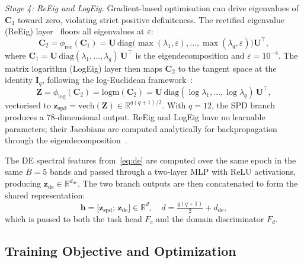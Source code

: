 \textit{Stage 4: ReEig and LogEig.}
Gradient-based optimisation can drive eigenvalues of $\mathbf{C}_1$ toward zero,
violating strict positive definiteness.
The rectified eigenvalue (ReEig) layer~\cite{huang2017riemannian} floors all
eigenvalues at $\varepsilon$:
\begin{equation}
  \mathbf{C}_2 = \phi_\mathrm{rec}(\mathbf{C}_1)
    = \mathbf{U}\,\mathrm{diag}\!\bigl(\max(\lambda_1,\varepsilon),\ldots,
      \max(\lambda_q,\varepsilon)\bigr)\mathbf{U}^\top,
  \label{eq:reeig}
\end{equation}
where $\mathbf{C}_1 = \mathbf{U}\,\mathrm{diag}(\lambda_1,\ldots,\lambda_q)\,\mathbf{U}^\top$
is the eigendecomposition and $\varepsilon = 10^{-4}$.
The matrix logarithm (LogEig) layer then maps $\mathbf{C}_2$ to the tangent
space at the identity $\mathbf{I}_q$, following the log-Euclidean
framework~\cite{arsigny2007geometric}:
\begin{equation}
  \mathbf{Z} = \phi_\mathrm{log}(\mathbf{C}_2)
    = \mathrm{logm}(\mathbf{C}_2)
    = \mathbf{U}\,\mathrm{diag}(\log\lambda_1,\ldots,\log\lambda_q)\,\mathbf{U}^\top,
  \label{eq:logeig}
\end{equation}
vectorised to $\mathbf{z}_\mathrm{spd} = \mathrm{vech}(\mathbf{Z})
\in\mathbb{R}^{q(q+1)/2}$.
With $q=12$, the SPD branch produces a 78-dimensional output.
ReEig and LogEig have no learnable parameters; their Jacobians are computed
analytically for backpropagation through the
eigendecomposition~\cite{huang2017riemannian}.

The DE spectral features from~\eqref{eq:de} are computed over the same epoch
in the same $B=5$ bands and passed through a two-layer MLP with ReLU activations,
producing $\mathbf{z}_\mathrm{de}\in\mathbb{R}^{d_\mathrm{de}}$.
The two branch outputs are then concatenated to form the shared representation:
\begin{equation}
  \mathbf{h} = \bigl[\mathbf{z}_\mathrm{spd};\,\mathbf{z}_\mathrm{de}\bigr]
    \in \mathbb{R}^{d},\quad d = \tfrac{q(q+1)}{2} + d_\mathrm{de},
  \label{eq:fusion}
\end{equation}
which is passed to both the task head $F_c$ and the domain discriminator $F_d$.

\subsection{Training Objective and Optimization}
\label{sec:training}

